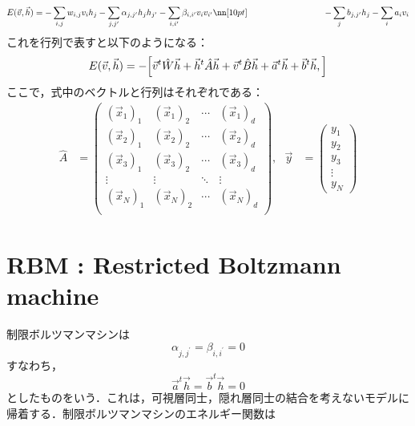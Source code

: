 \begin{align}
     E(\vec{v},\vec{h}) 
    &= -\sum_{i,j}w_{i,j} v_i h_j -\sum_{j,j^\prime} \alpha_{j,j^\prime}h_j h_{j^{\prime}}
    -\sum_{i,i^\prime} \beta_{i,i^\prime} v_i v_{i^{\prime}}\nn[10pt]
    &\hspace{80pt}-\sum_{j} b_{j,j^\prime}h_j  -\sum_{i} a_{i} v_i
\end{align}
これを行列で表すと以下のようになる：
\begin{equation}
        E(\vec{v},\vec{h}) 
        =-\Bigl[
        \Vec{v}^{t}\hat{W}\Vec{h} + \Vec{h}^{t}\hat{A}\Vec{h} + \Vec{v}^{t}\hat{B}\Vec{h}
        + \Vec{a}^{t}\Vec{h}+ \Vec{b}^{t}\Vec{h},
        \Bigr]
\end{equation}
ここで，式中のベクトルと行列はそれぞれである：
\begin{align}
    \hat{A}
    &
    =
    \left(
        \begin{array}{cccc}
       (\vec{x}_1)_1&(\vec{x}_1)_2&\cdots&(\vec{x}_1)_d\\[10pt]
       (\vec{x}_2)_1&(\vec{x}_2)_2&\cdots&(\vec{x}_2)_d\\[10pt]
       (\vec{x}_3)_1&(\vec{x}_3)_2&\cdots&(\vec{x}_3)_d\\[10pt]
       \vdots&\vdots&\ddots&\vdots\\[10pt]
       (\vec{x}_N)_1&(\vec{x}_N)_2&\cdots&(\vec{x}_N)_d\\[10pt]
        \end{array}
    \right),\ \ \ 
    \vec{y}
    &
    =\left(
        \begin{array}{c}
       {y}_1\\[5pt]
       {y}_2\\[5pt]
       {y}_3\\[5pt]
       \vdots\\[5pt]
       {y}_N
        \end{array}
    \right)
\end{align}
\section{RBM : Restricted Boltzmann machine}
制限ボルツマンマシンは
\begin{equation}
    \alpha_{j,j^\prime} = \beta_{i,i^\prime} = 0
\end{equation}
すなわち，
\begin{equation}
    \Vec{a}^{t}\Vec{h} = \Vec{b}^{t}\Vec{h} = 0
\end{equation}
としたものをいう．これは，可視層同士，隠れ層同士の結合を考えないモデルに帰着する．制限ボルツマンマシンのエネルギー関数は

